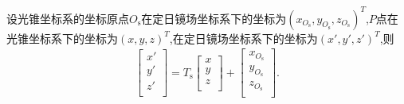 \documentclass[../main.tex]{subfiles}
\begin{document}
\par 设光锥坐标系的坐标原点$O_\text{s}$在定日镜场坐标系下的坐标为$(x_{O_{\text{s}}},y_{O_{\text{s}}},z_{O_{\text{s}}})^T$,$P$点在光锥坐标系下的坐标为$(x,y,z)^T$,在定日镜场坐标系下的坐标为$(x',y',z')^T$,则
\begin{align}\label{eq:100.2}
\left[ \begin{matrix}
x'\\
y'\\
z'\\
\end{matrix} \right] =T_{\text{s}}\left[ \begin{matrix}
x\\
y\\
z\\
\end{matrix} \right]+\left[ \begin{matrix}
x_{O_{\text{s}}}\\
y_{O_{\text{s}}}\\
z_{O_{\text{s}}}\\
\end{matrix} \right]  .
\end{align}
\end{document}
